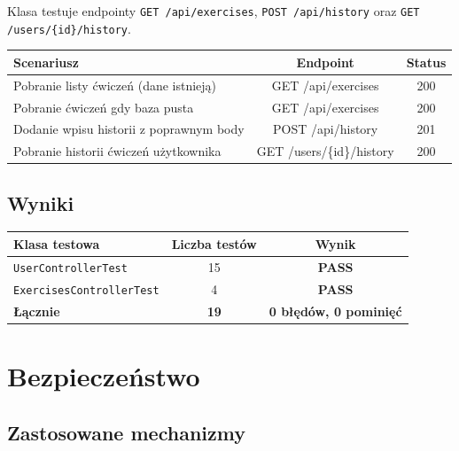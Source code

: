 \documentclass[12pt,a4paper]{article}
\begin{document}
Klasa testuje endpointy \texttt{GET /api/exercises}, \texttt{POST /api/history}
oraz \texttt{GET /users/\{id\}/history}.

\begin{center}
\begin{tabular}{p{7.5cm}cc}
  \toprule
  \textbf{Scenariusz} & \textbf{Endpoint} & \textbf{Status} \\
  \midrule
  Pobranie listy ćwiczeń (dane istnieją)          & GET /api/exercises      & 200 \\
  Pobranie ćwiczeń gdy baza pusta                 & GET /api/exercises      & 200 \\
  Dodanie wpisu historii z poprawnym body         & POST /api/history       & 201 \\
  Pobranie historii ćwiczeń użytkownika           & GET /users/\{id\}/history & 200 \\
  \bottomrule
\end{tabular}
\end{center}

\subsection{Wyniki}

\begin{center}
\begin{tabular}{lcc}
  \toprule
  \textbf{Klasa testowa} & \textbf{Liczba testów} & \textbf{Wynik} \\
  \midrule
  \texttt{UserControllerTest}      & 15 & \textcolor{green!60!black}{\textbf{PASS}} \\
  \texttt{ExercisesControllerTest} &  4 & \textcolor{green!60!black}{\textbf{PASS}} \\
  \midrule
  \textbf{Łącznie} & \textbf{19} & \textbf{0 błędów, 0 pominięć} \\
  \bottomrule
\end{tabular}
\end{center}

\section{Bezpieczeństwo}

\subsection{Zastosowane mechanizmy}
\end{document}
